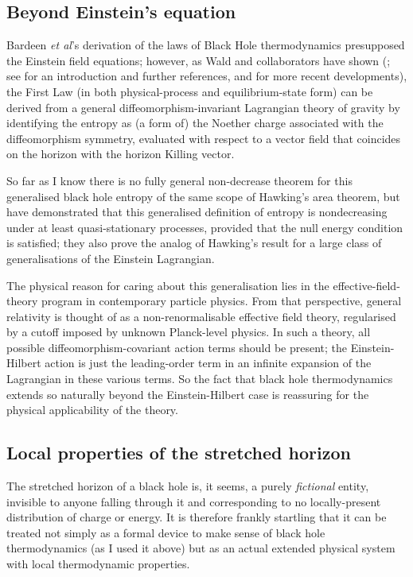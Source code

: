 \documentclass[12pt]{article}
\begin{document}
\subsection{Beyond Einstein's equation}

Bardeen \emph{et al}'s derivation of the laws of Black Hole thermodynamics presupposed the Einstein field equations; however, as Wald and collaborators have shown (; see  for an introduction and further references, and  for more recent developments), the First Law (in both physical-process and equilibrium-state form) can be derived from a general diffeomorphism-invariant Lagrangian theory of gravity by identifying the entropy as (a form of) the Noether charge associated with the diffeomorphism symmetry, evaluated with respect to a vector field that coincides on the horizon with the horizon Killing vector.

 So far as I know there is no fully general non-decrease theorem for this generalised black hole entropy of the same scope of Hawking's area theorem, but  have demonstrated that this generalised definition of entropy is nondecreasing under at least quasi-stationary processes, provided that the null energy condition is satisfied; they also prove the analog of Hawking's result for a large class of generalisations of the Einstein Lagrangian.

The physical reason for caring about this generalisation lies in the effective-field-theory program in contemporary particle physics. From that perspective, general relativity is thought of as a non-renormalisable effective field theory, regularised by a cutoff imposed by unknown Planck-level physics. In such a theory, all possible diffeomorphism-covariant action terms should be present; the Einstein-Hilbert action is just the leading-order term in an infinite expansion of the Lagrangian in these various terms. So the fact that black hole thermodynamics extends so naturally beyond the Einstein-Hilbert case is reassuring for the physical applicability of the theory. 

\subsection{Local properties of the stretched horizon}\label{localblackhole}

The stretched horizon of a black hole is, it seems, a purely \emph{fictional} entity, invisible to anyone falling through it and corresponding to no locally-present distribution of charge or energy. It is therefore frankly startling that it can be treated not simply as a formal device to make sense of black hole thermodynamics (as I used it above) but as an actual extended physical system with local thermodynamic properties.
\end{document}
